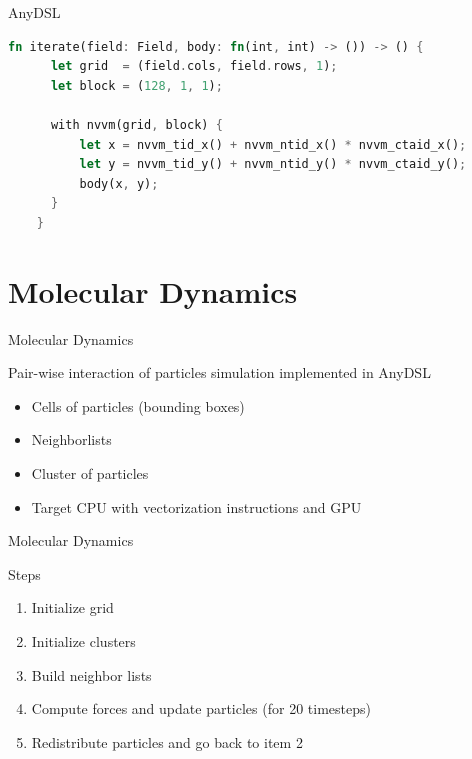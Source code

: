 \documentclass[aspectratio=43,t]{beamer}
\begin{document}
  \begin{frame}[fragile]{AnyDSL}
    \begin{lstlisting}[language=Rust]
    fn iterate(field: Field, body: fn(int, int) -> ()) -> () {
      let grid  = (field.cols, field.rows, 1);
      let block = (128, 1, 1);

      with nvvm(grid, block) {
          let x = nvvm_tid_x() + nvvm_ntid_x() * nvvm_ctaid_x();
          let y = nvvm_tid_y() + nvvm_ntid_y() * nvvm_ctaid_y();
          body(x, y);
      }
    }
    \end{lstlisting}
  \end{frame}

  \section{Molecular Dynamics}
  \begin{frame}{Molecular Dynamics}
    \begin{block}{Pair-wise interaction of particles simulation implemented in AnyDSL}
      \begin{itemize}
        \item Cells of particles (bounding boxes)
        \item Neighborlists
        \item Cluster of particles
        \item Target CPU with vectorization instructions and GPU
      \end{itemize}
    \end{block}
  \end{frame}

  \begin{frame}{Molecular Dynamics}
    \begin{block}{Steps}
      \begin{enumerate}
        \item<1-> Initialize grid
        \item<2-> Initialize clusters
        \item<3-> Build neighbor lists
        \item<4-> Compute forces and update particles (for 20 timesteps)
        \item<5-> Redistribute particles and go back to item 2
      \end{enumerate}
    \end{block}
  \end{frame}
\end{document}
